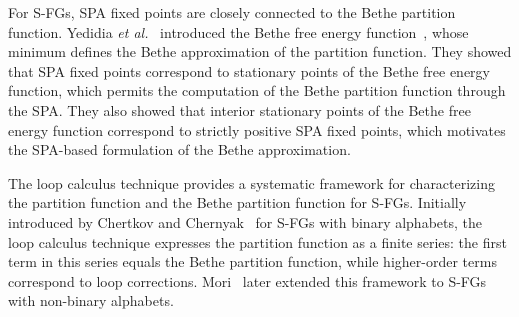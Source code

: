 \documentclass[journal]{IEEEtran}
\newcommand{\add}[1]{{\color{black}#1}}
\newcommand*{\etal}{\textit{et al.}}
\begin{document}
\add{For S-FGs, SPA fixed points are closely connected to the Bethe partition
  function. Yedidia \etal~\cite{Yedidia2005} introduced the Bethe free energy
  function~\cite{Bethe1935}, whose minimum defines the Bethe approximation of
  the partition function. They showed that SPA fixed points correspond to
  stationary points of the Bethe free energy function, which permits the
  computation of the Bethe partition function through the SPA.
  They also showed that interior stationary points of the
  Bethe free energy function correspond to strictly
  positive SPA fixed points, which motivates the SPA-based
  formulation of the Bethe approximation.}

The loop calculus technique provides a systematic framework for characterizing
the partition function and the Bethe partition function for
\add{S-FGs}. Initially introduced by Chertkov and Chernyak~\cite{Chertkov2006,
  Chernyak2007} for S-FGs with binary alphabets, the loop calculus technique
\add{expresses the partition function as a finite series}: the first term in
this series equals the Bethe partition function, while higher-order terms
correspond to loop corrections. Mori~\cite{Mori2015} later extended this
framework to S-FGs with non-binary alphabets.
\end{document}
